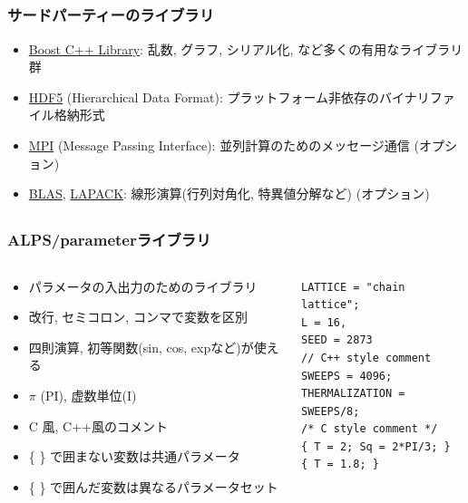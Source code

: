 \subsection*{\redm\whitem\greenb}
\begin{frame}[t,fragile]
  \frametitle{サードパーティーのライブラリ}
  \begin{itemize}
    \setlength{\itemsep}{1em}
  \item \href{http://www.boost.org/}{Boost C++ Library}: 乱数, グラフ, シリアル化, など多くの有用なライブラリ群
  \item \href{http://www.hdfgroup.org/HDF5/}{HDF5} (Hierarchical Data Format): プラットフォーム非依存のバイナリファイル格納形式
  \item \href{http://www.mpi-forum.org/}{MPI} (Message Passing Interface): 並列計算のためのメッセージ通信 (オプション)
  \item \href{http://www.netlib.org/blas/}{BLAS}, \href{http://www.netlib.org/lapack/}{LAPACK}: 線形演算(行列対角化, 特異値分解など) (オプション)
  \end{itemize}
\end{frame}

\subsection*{\redm\whitem\greenb}
\begin{frame}[t,fragile]
  \frametitle{ALPS/parameterライブラリ}
  \begin{columns}[T]
    \begin{column}{.5\textwidth}
      \begin{itemize}
      \item パラメータの入出力のためのライブラリ
        \item 改行, セミコロン, コンマで変数を区別
        \item 四則演算, 初等関数(sin, cos, expなど)が使える
        \item $\pi$ (PI), 虚数単位(I)
          \item C 風, C++風のコメント
          \item \{ \} で囲まない変数は共通パラメータ
          \item \{ \} で囲んだ変数は異なるパラメータセット
      \end{itemize}
    \end{column}
    \begin{column}{.5\textwidth}
    \begin{lstlisting}
LATTICE = "chain lattice";
L = 16,
SEED = 2873
// C++ style comment
SWEEPS = 4096;
THERMALIZATION = SWEEPS/8;
/* C style comment */
{ T = 2; Sq = 2*PI/3; }
{ T = 1.8; }
\end{lstlisting}
    \end{column}
  \end{columns}
\end{frame}

